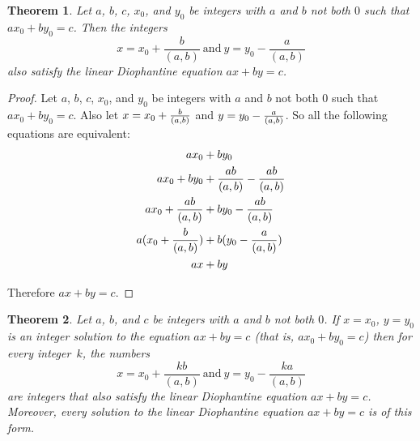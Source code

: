 \documentclass[12pt,leqno]{article}
\numberwithin{equation}{section}
\newtheorem{thm}{Theorem}[section]
\theoremstyle{definition}
\begin{document}
\pagebreak
\begin{thm}
Let $a$, $b$, $c$, $x_0$, and $y_0$ be integers with $a$ and $b$ not
both $0$ such that $ax_0 + by_0 = c$.  Then the integers
\[x = x_0 + \frac{b}{(a,b)}\ {\textstyle\textrm{and}}\
y = y_0 - \frac{a}{(a,b)}\] also satisfy the linear Diophantine
equation $ax + by = c$.
\end{thm}


\begin{proof}[Proof]
Let $a$, $b$, $c$, $x_0$, and $y_0$ be integers with $a$ and $b$ not both $0$ such that $ax_0 + by_0 = c$. Also let $x = x_0 + {b \over (a, b)}$ and $y = y_0 - { a \over (a, b)}$.  So all the following equations are equivalent:
\begin{align*}
ax_0 &+ by_0\\
ax_0 + by_0 &+ {ab \over (a, b)} - {ab \over (a, b)} \\
ax_0 + {ab \over (a, b)} &+ by_0 - {ab \over (a, b)} \\ 
a(x_0 + {b \over (a, b)}) &+ b(y_0 - { a \over (a, b)})\\
ax &+ by
\end{align*}

Therefore $ax + by = c$.

\end{proof}

\setcounter{thm}{52}

\begin{thm}
Let $a$, $b$, and $c$ be integers with $a$ and $b$ not both $0$. If
$x=x_0$, $y=y_0$ is an integer solution to the equation $ax+by=c$
(that is, $ax_0 + by_0 = c$) then for every integer~$k$, the numbers
\[x = x_0 + \frac{kb}{(a,b)}\ {\textstyle\textrm{and}}\ y = y_0 -
\frac{ka}{(a,b)}\] are integers that also satisfy the linear
Diophantine equation $ax + by = c$.  Moreover, every solution to the
linear Diophantine equation $ax + by = c$ is of this form.
\end{thm}
\end{document}
